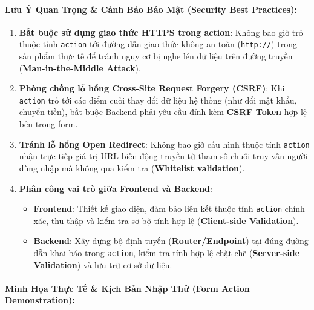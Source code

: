 \documentclass[11pt,oneside]{book}
\newcommand{\codeinline}[1]{\textcolor{accentOrange}{\texttt{#1}}}
\newcommand{\term}[1]{\textbf{\textcolor{primaryBlue}{#1}}}
\begin{document}
\paragraph{Lưu Ý Quan Trọng \& Cảnh Báo Bảo Mật (Security Best Practices):}

\begin{warnBox}
\begin{enumerate}[leftmargin=1.5em, itemsep=3pt, parsep=0pt]
    \item \textbf{Bắt buộc sử dụng giao thức HTTPS trong action}: Không bao giờ trỏ thuộc tính \codeinline{action} tới đường dẫn giao thức không an toàn (\codeinline{http://}) trong sản phẩm thực tế để tránh nguy cơ bị nghe lén dữ liệu trên đường truyền (\term{Man-in-the-Middle Attack}).
    \item \textbf{Phòng chống lỗ hổng Cross-Site Request Forgery (CSRF)}: Khi \codeinline{action} trỏ tới các điểm cuối thay đổi dữ liệu hệ thống (như đổi mật khẩu, chuyển tiền), bắt buộc Backend phải yêu cầu đính kèm \term{CSRF Token} hợp lệ bên trong form.
    \item \textbf{Tránh lỗ hổng Open Redirect}: Không bao giờ cấu hình thuộc tính \codeinline{action} nhận trực tiếp giá trị URL biến động truyền từ tham số chuỗi truy vấn người dùng nhập mà không qua kiểm tra (\term{Whitelist validation}).
    \item \textbf{Phân công vai trò giữa Frontend và Backend}:
    \begin{itemize}[leftmargin=1.2em, itemsep=2pt]
        \item \textbf{Frontend}: Thiết kế giao diện, đảm bảo liên kết thuộc tính \codeinline{action} chính xác, thu thập và kiểm tra sơ bộ tính hợp lệ (\term{Client-side Validation}).
        \item \textbf{Backend}: Xây dựng bộ định tuyến (\term{Router/Endpoint}) tại đúng đường dẫn khai báo trong \codeinline{action}, kiểm tra tính hợp lệ chặt chẽ (\term{Server-side Validation}) và lưu trữ cơ sở dữ liệu.
    \end{itemize}
\end{enumerate}
\end{warnBox}

\paragraph{Minh Họa Thực Tế \& Kịch Bản Nhập Thử (Form Action Demonstration):}
\end{document}

